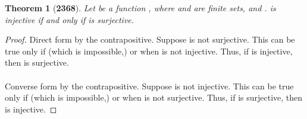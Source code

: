 \documentclass[preview]{standalone}
\newtheorem*{theorem*}{Theorem}
\begin{document}
\begin{theorem*}[\textbf{2368}]
    Let \bm{$\lambda$} be a function 
    , 
    where  and \bm{$\mathrm{\Lambda}$} are finite sets, 
    and . 
    \bm{$\lambda$} is injective 
    if and only if 
    \bm{$\lambda$} is surjective.
\end{theorem*}

\begin{proof}
    Direct form by the contrapositive. 
    Suppose \bm{$\lambda$} is not surjective. 
    This can be true only if  (which is impossible,) 
    or when \bm{$\lambda$} is not injective.
    Thus, if \bm{$\lambda$} is injective, then \bm{$\lambda$} is surjective.
    \\ \\
    Converse form by the contrapositive. Suppose \bm{$\lambda$} is not injective.
    This can be true only if  (which is impossible,) 
    or when \bm{$\lambda$} is not surjective. 
    Thus, if \bm{$\lambda$} is surjective, then \bm{$\lambda$} is injective.
\color{lightgray} \end{proof}
\end{document}
